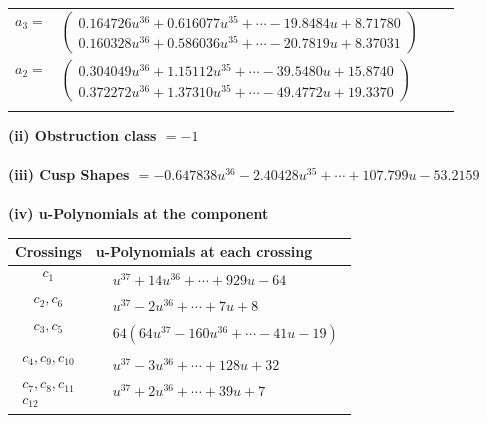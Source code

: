 \documentclass[1p]{elsarticle_modified}
\theoremstyle{definition}
\begin{document}
\begin{tabular}{m{7pt} m{180pt} m{7pt} m{180pt} }
\flushright $a_{3}=$&$\begin{pmatrix}0.164726 u^{36}+0.616077 u^{35}+\cdots-19.8484 u+8.71780\\0.160328 u^{36}+0.586036 u^{35}+\cdots-20.7819 u+8.37031\end{pmatrix}$ \\
\flushright $a_{2}=$&$\begin{pmatrix}0.304049 u^{36}+1.15112 u^{35}+\cdots-39.5480 u+15.8740\\0.372272 u^{36}+1.37310 u^{35}+\cdots-49.4772 u+19.3370\end{pmatrix}$\\&\end{tabular}
\flushleft \textbf{(ii) Obstruction class $= -1$}\\~\\
\flushleft \textbf{(iii) Cusp Shapes $= -0.647838 u^{36}-2.40428 u^{35}+\cdots+107.799 u-53.2159$}\\~\\
\newpage\renewcommand{\arraystretch}{1}
\flushleft \textbf{(iv) u-Polynomials at the component}\newline \\
\begin{tabular}{m{50pt}|m{274pt}}
Crossings & \hspace{64pt}u-Polynomials at each crossing \\
\hline $$\begin{aligned}c_{1}\end{aligned}$$&$\begin{aligned}
&u^{37}+14 u^{36}+\cdots+929 u-64
\end{aligned}$\\
\hline $$\begin{aligned}c_{2},c_{6}\end{aligned}$$&$\begin{aligned}
&u^{37}-2 u^{36}+\cdots+7 u+8
\end{aligned}$\\
\hline $$\begin{aligned}c_{3},c_{5}\end{aligned}$$&$\begin{aligned}
&64(64 u^{37}-160 u^{36}+\cdots-41 u-19)
\end{aligned}$\\
\hline $$\begin{aligned}c_{4},c_{9},c_{10}\end{aligned}$$&$\begin{aligned}
&u^{37}-3 u^{36}+\cdots+128 u+32
\end{aligned}$\\
\hline $$\begin{aligned}c_{7},c_{8},c_{11}\\c_{12}\end{aligned}$$&$\begin{aligned}
&u^{37}+2 u^{36}+\cdots+39 u+7
\end{aligned}$\\
\hline
\end{tabular}\\~\\
\end{document}
